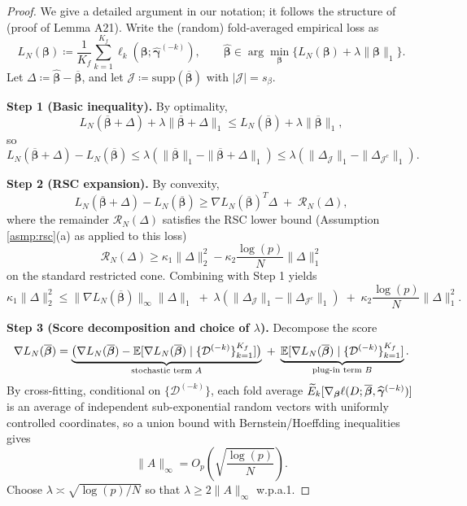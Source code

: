 \documentclass{article}
\begin{document}
\begin{proof}
We give a detailed argument in our notation; it follows the structure of \citet{hou2025efficient} (proof of Lemma A21).
Write the (random) fold-averaged empirical loss as
\[
L_N(\boldsymbol{\beta}) \coloneqq \frac{1}{K_f}\sum_{k=1}^{K_f}\ell_k(\boldsymbol{\beta};\widehat{\boldsymbol{\gamma}}^{(-k)}),
\qquad
\widehat{\boldsymbol{\beta}}\in\arg\min_{\boldsymbol{\beta}}\{L_N(\boldsymbol{\beta})+\lambda\|\boldsymbol{\beta}\|_1\}.
\]
Let $\Delta\coloneqq \widehat{\boldsymbol{\beta}}-\overline{\boldsymbol{\beta}}$, and let $\mathcal{J}\coloneqq \mathrm{supp}(\overline{\boldsymbol{\beta}})$ with $|\mathcal{J}|=s_\beta$.

\textbf{Step 1 (Basic inequality).}
By optimality,
\[
L_N(\overline{\boldsymbol{\beta}}+\Delta)+\lambda\|\overline{\boldsymbol{\beta}}+\Delta\|_1
\le
L_N(\overline{\boldsymbol{\beta}})+\lambda\|\overline{\boldsymbol{\beta}}\|_1,
\]
so
\[
L_N(\overline{\boldsymbol{\beta}}+\Delta)-L_N(\overline{\boldsymbol{\beta}})
\le
\lambda(\|\overline{\boldsymbol{\beta}}\|_1-\|\overline{\boldsymbol{\beta}}+\Delta\|_1)
\le
\lambda(\|\Delta_{\mathcal{J}}\|_1-\|\Delta_{\mathcal{J}^c}\|_1).
\]

\textbf{Step 2 (RSC expansion).}
By convexity,
\[
L_N(\overline{\boldsymbol{\beta}}+\Delta)-L_N(\overline{\boldsymbol{\beta}})
\ge
\nabla L_N(\overline{\boldsymbol{\beta}})^T\Delta
\;+\;
\mathcal{R}_N(\Delta),
\]
where the remainder $\mathcal{R}_N(\Delta)$ satisfies the RSC lower bound (Assumption \ref{asmp:rsc}(a) as applied to this loss)
\[
\mathcal{R}_N(\Delta)
\ge
\kappa_1\|\Delta\|_2^2-\kappa_2\frac{\log(p)}{N}\|\Delta\|_1^2
\]
on the standard restricted cone. Combining with Step 1 yields
\begin{equation}\label{eq:nuis_prelim_bound}
\kappa_1\|\Delta\|_2^2
\le
\|\nabla L_N(\overline{\boldsymbol{\beta}})\|_\infty\|\Delta\|_1
\;+\;
\lambda(\|\Delta_{\mathcal{J}}\|_1-\|\Delta_{\mathcal{J}^c}\|_1)
\;+\;
\kappa_2\frac{\log(p)}{N}\|\Delta\|_1^2.
\end{equation}

\textbf{Step 3 (Score decomposition and choice of $\lambda$).}
Decompose the score
\[
\nabla L_N(\overline{\boldsymbol{\beta}})
=
\underbrace{\big(\nabla L_N(\overline{\boldsymbol{\beta}})-\operatorname{\mathbb{E}}[\nabla L_N(\overline{\boldsymbol{\beta}})\mid \{\mathcal{D}^{(-k)}\}_{k=1}^{K_f}]\big)}_{\text{stochastic term }A}
\;+\;
\underbrace{\operatorname{\mathbb{E}}[\nabla L_N(\overline{\boldsymbol{\beta}})\mid \{\mathcal{D}^{(-k)}\}_{k=1}^{K_f}]}_{\text{plug-in term }B}.
\]
By cross-fitting, conditional on $\{\mathcal{D}^{(-k)}\}$, each fold average $\widetilde{E}_k[\nabla_{\boldsymbol{\beta}}\ell(D;\overline{\boldsymbol{\beta}},\widehat{\boldsymbol{\gamma}}^{(-k)})]$ is an average of independent sub-exponential random vectors with uniformly controlled coordinates, so a union bound with Bernstein/Hoeffding inequalities gives
\[
\|A\|_\infty = O_p\!\left(\sqrt{\frac{\log(p)}{N}}\right).
\]
Choose $\lambda\asymp\sqrt{\log(p)/N}$ so that $\lambda\ge 2\|A\|_\infty$ w.p.a.1.


\end{proof}
\end{document}
